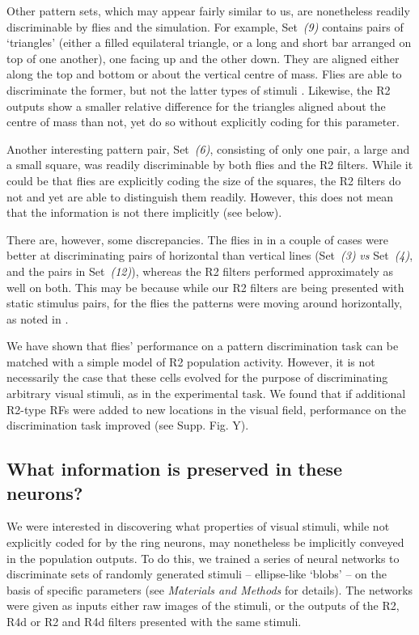 Other pattern sets, which may appear fairly similar to us, are nonetheless readily discriminable by flies and the simulation.
For example, Set~\emph{(9)} contains pairs of `triangles' (either a filled equilateral triangle, or a long and short bar arranged on top of one another), one facing up and the other down.
They are aligned either along the top and bottom or about the vertical centre of mass.
Flies are able to discriminate the former, but not the latter types of stimuli \cite{Ernst1999}.
Likewise, the R2 outputs show a smaller relative difference for the triangles aligned about the centre of mass than not, yet do so without explicitly coding for this parameter.

Another interesting pattern pair, Set~\emph{(6)}, consisting of only one pair, a large and a small square, was readily discriminable by both flies and the R2 filters.
While it could be that flies are explicitly coding the size of the squares, the R2 filters do not and yet are able to distinguish them readily.
However, this does not mean that the information is not there implicitly (see below).

There are, however, some discrepancies.
The flies in \cite{Ernst1999} in a couple of cases were better at discriminating pairs of horizontal than vertical lines (Set~\emph{(3)} \emph{vs} Set~\emph{(4)}, and the pairs in Set~\emph{(12)}), whereas the R2 filters performed approximately as well on both.
This may be because while our R2 filters are being presented with static stimulus pairs, for the flies the patterns were moving around horizontally, as noted in \cite{Ernst1999}.

We have shown that flies' performance on a pattern discrimination task can be matched with a simple model of R2 population activity.
However, it is not necessarily the case that these cells evolved for the purpose of discriminating arbitrary visual stimuli, as in the experimental task.
We found that if additional R2-type RFs were added to new locations in the visual field, performance on the discrimination task improved (see Supp. Fig. Y).

\subsection{What information is preserved in these neurons?}
We were interested in discovering what properties of visual stimuli, while not explicitly coded for by the ring neurons, may nonetheless be implicitly conveyed in the population outputs.
To do this, we trained a series of neural networks to discriminate sets of randomly generated stimuli -- ellipse-like `blobs' -- on the basis of specific parameters (see \emph{Materials and Methods} for details).
The networks were given as inputs either raw images of the stimuli, or the outputs of the R2, R4d or R2 and R4d filters presented with the same stimuli.

